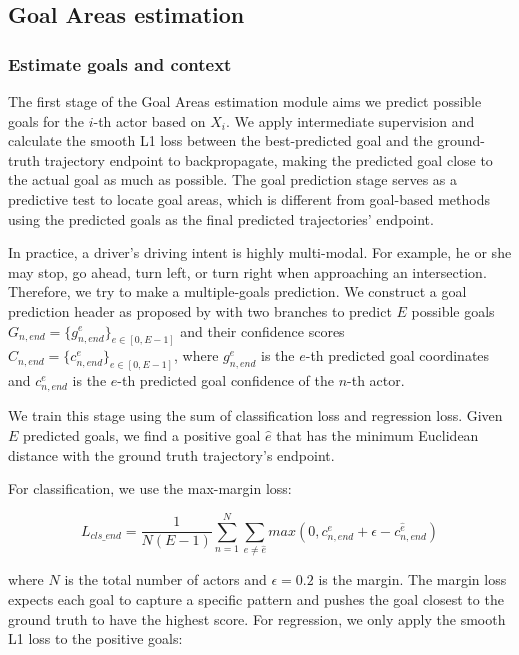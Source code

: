 \subsection{Goal Areas estimation}
\label{subsec:7_improving_efficiency_goal_areas_estimation}

\subsubsection{Estimate goals and context}
\label{subsubsec:7_improving_efficiency_estimate_goals}

The first stage of the Goal Areas estimation module aims we predict possible goals for the $i$-th actor based on $X_i$. We apply intermediate supervision and calculate the smooth L1 loss between the best-predicted goal and the ground-truth trajectory endpoint to backpropagate, making the predicted goal close to the actual goal as much as possible. The goal prediction stage serves as a predictive test to locate goal areas, which is different from goal-based methods using the predicted goals as the final predicted trajectories' endpoint. 

In practice, a driver's driving intent is highly multi-modal. For example, he or she may stop, go ahead, turn left, or turn right when approaching an intersection. Therefore, we try to make a multiple-goals prediction. We construct a goal prediction header as proposed by \cite{wang2022ganet} with two branches to predict $E$ possible goals $G_{n,end} =\{g_{n,end}^e\}_{e \in [0,E-1]}$ and their confidence scores $    C_{n,end} = \{c_{n,end}^e\}_{e \in [0,E-1]}$, where $g_{n,end}^e$ is the $e$-th predicted goal coordinates and $c_{n,end}^e$ is the $e$-th predicted goal confidence of the $n$-th actor.

We train this stage using the sum of classification loss and regression loss.
Given $E$ predicted goals, we find a positive goal $\hat{e}$ that has the minimum Euclidean distance with the ground truth trajectory's endpoint. 

For classification, we use the max-margin loss:

\begin{equation}
	L_{cls\_end}=\frac{1}{N(E-1)}\sum_{n=1}^N\sum_{e\neq \hat{e}}{max(0,c^e_{n,end}+\epsilon -c^{\hat{e}}_{n,end})}
\end{equation}

where $N$ is the total number of actors and $\epsilon =0.2$ is the margin. The margin loss expects each goal to capture a specific pattern and pushes the goal closest to the ground truth to have the highest score. For regression, we only apply the smooth L1 loss to the positive goals:

